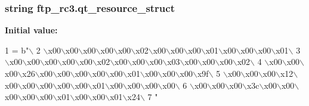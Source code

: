 \subsubsection[{qt\+\_\+resource\+\_\+struct}]{\setlength{\rightskip}{0pt plus 5cm}string ftp\+\_\+rc3.\+qt\+\_\+resource\+\_\+struct}\label{namespaceftp__rc3_ad8908e61ce5f0084b2cb3246d40d5143}
{\bfseries Initial value\+:}
\begin{DoxyCode}
1 = b\textcolor{stringliteral}{"\(\backslash\)}
2 \textcolor{stringliteral}{\(\backslash\)x00\(\backslash\)x00\(\backslash\)x00\(\backslash\)x00\(\backslash\)x00\(\backslash\)x02\(\backslash\)x00\(\backslash\)x00\(\backslash\)x00\(\backslash\)x01\(\backslash\)x00\(\backslash\)x00\(\backslash\)x00\(\backslash\)x01\(\backslash\)}
3 \textcolor{stringliteral}{\(\backslash\)x00\(\backslash\)x00\(\backslash\)x00\(\backslash\)x00\(\backslash\)x00\(\backslash\)x02\(\backslash\)x00\(\backslash\)x00\(\backslash\)x00\(\backslash\)x03\(\backslash\)x00\(\backslash\)x00\(\backslash\)x00\(\backslash\)x02\(\backslash\)}
4 \textcolor{stringliteral}{\(\backslash\)x00\(\backslash\)x00\(\backslash\)x00\(\backslash\)x26\(\backslash\)x00\(\backslash\)x00\(\backslash\)x00\(\backslash\)x00\(\backslash\)x00\(\backslash\)x01\(\backslash\)x00\(\backslash\)x00\(\backslash\)x00\(\backslash\)x9f\(\backslash\)}
5 \textcolor{stringliteral}{\(\backslash\)x00\(\backslash\)x00\(\backslash\)x00\(\backslash\)x12\(\backslash\)x00\(\backslash\)x00\(\backslash\)x00\(\backslash\)x00\(\backslash\)x00\(\backslash\)x01\(\backslash\)x00\(\backslash\)x00\(\backslash\)x00\(\backslash\)x00\(\backslash\)}
6 \textcolor{stringliteral}{\(\backslash\)x00\(\backslash\)x00\(\backslash\)x00\(\backslash\)x3c\(\backslash\)x00\(\backslash\)x00\(\backslash\)x00\(\backslash\)x00\(\backslash\)x00\(\backslash\)x01\(\backslash\)x00\(\backslash\)x00\(\backslash\)x01\(\backslash\)x24\(\backslash\)}
7 \textcolor{stringliteral}{"}
\end{DoxyCode}
